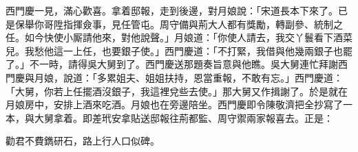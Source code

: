 西門慶一見，滿心歡喜。拿着邸報，走到後邊，對月娘說：「宋道長本下來了。已是保舉你哥陞指揮僉事，見任管屯。周守備與荊大人都有獎勵，轉副參、統制之任。如今快使小厮請他來，對他說聲。」月娘道：「你使人請去，我交丫鬟看下酒菜兒。我愁他這一上任，也要銀子使。」西門慶道：「不打緊，我借與他幾兩銀子也罷了。」不一時，請得吳大舅到了。西門慶送那題奏旨意與他瞧。吳大舅連忙拜謝西門慶與月娘，說道：「多累姐夫、姐姐扶持，恩當重報，不敢有忘。」西門慶道：「大舅，你若上任擺酒沒銀子，我這裡兌些去使。」那大舅又作揖謝了。於是就在月娘房中，安排上酒來吃酒。月娘也在旁邊陪坐。西門慶即令陳敬濟把全抄寫了一本，與大舅拿着。即差玳安拿貼送邸報往荊都監、周守禦兩家報喜去。正是：

\begin{myquote}
勸君不費鐫研石，路上行人口似碑。
\end{myquote}

